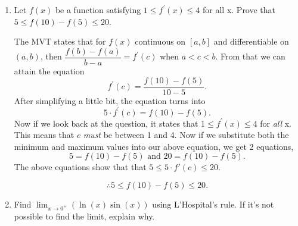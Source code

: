 \documentclass{article}
\begin{document}
\begin{enumerate}[label=\textbf{(12.\arabic*)}]



\item Let $f(x)$ be a function satisfying $1\le f^\prime(x) \le4$ for all x. Prove that $5\le f(10)-f(5)\le 20$.

\par

The MVT states that for $f(x)$ continuous on $[a,b]$ and differentiable on $(a,b)$, then $\dfrac{f(b)-f(a)}{b-a}=f^\prime(c)$ when $a<c<b$. From that we can attain the equation
\[f^\prime(c)=\frac{f(10)-f(5)}{10-5}\text{.}\] %
After simplifying a little bit, the equation turns into
\[5\cdot f^{\prime}(c)=f(10)-f(5)\text{.}\] %
Now if we look back at the question, it states that $1\le f^\prime(x) \le4$ for \textit{all} x. This means that $c$ \textit{must} be between 1 and 4. Now if we substitute both the minimum and maximum values into our above equation, we get 2 equations,
\[5=f(10)-f(5)\text{ and }20=f(10)-f(5)\text{.}\] %
The above equations show that that $5\le 5\cdot f\prime(c)\le20$.
\begin{tcolorbox}[colback=white]
\[\therefore  5\le f(10)-f(5)\le20\text{.}\] %
\centering
\end{tcolorbox}
\bigskip


\item Find $\lim_{x\to0^{+}} {\left(\ln{(x)}\sin{(x)}\right)}$ using L'Hospital's rule. If it's not possible  to find the limit, explain why.\\


\end{enumerate}
\end{document}
